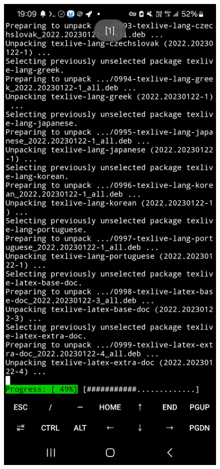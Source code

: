 \documentclass[a4paper,12pt]{./article}
\begin{document}
\begin{center}
\begin{figure}[H]
\begin{minipage}[t]{./0.45\textwidth}
\end{minipage}
\hfill
\begin{minipage}[t]{./0.45\textwidth}
\centering
\includegraphics[width=\textwidth]{./working_screenshots/4.jpg}
\end{minipage}
\hfill
\end{figure}\FloatBarrier\end{center}
\end{document}
